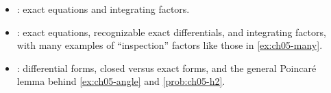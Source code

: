 \begin{itemize}
  \item \textcite[\S2.6]{BoyceDiPrima}: exact equations and integrating factors.
  \item \textcite[Lessons 9--10]{TenenbaumPollard}: exact equations, recognizable
        exact differentials, and integrating factors, with many examples of
        ``inspection'' factors like those in \cref{ex:ch05-many}.
  \item \textcite[Ch.~10]{Rudin}: differential forms, closed versus exact forms,
        and the general Poincar\'e lemma behind \cref{ex:ch05-angle} and
        \cref{prob:ch05-h2}.
\end{itemize}
